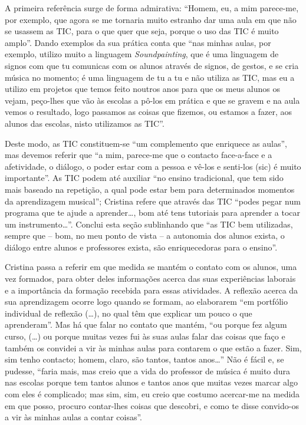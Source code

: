\documentclass{textolivre}
\begin{document}
A primeira referência surge de forma admirativa: “Homem, eu, a mim parece-me,
por exemplo, que agora se me tornaria muito estranho dar uma aula em que não se
usassem as TIC, para o que quer que seja, porque o uso das TIC é muito amplo”.
Dando exemplos da sua prática conta que “nas minhas aulas, por exemplo, utilizo
muito a linguagem \textit{Soundpainting}, que é uma linguagem de signos com que
tu comunicas com os alunos através de signos, de gestos, e se cria música no
momento; é uma linguagem de tu a tu e não utiliza as TIC, mas eu a utilizo em
projetos que temos feito noutros anos para que os meus alunos os vejam,
peço-lhes que vão às escolas a pô-los em prática e que se gravem e na aula
vemos o resultado, logo passamos as coisas que fizemos, ou estamos a fazer, aos
alunos das escolas, nisto utilizamos as TIC”.

Deste modo, as TIC constituem-se “um complemento que enriquece as aulas”, mas
devemos referir que “a mim, parece-me que o contacto face-a-face e a
afetividade, o diálogo, o poder estar com a pessoa e vê-los e senti-los (sic) é
muito importante”. As TIC podem até auxiliar “no ensino tradicional, que tem
sido mais baseado na repetição, a qual pode estar bem para determinados
momentos da aprendizagem musical”; Cristina refere que através das TIC “podes
pegar num programa que te ajude a aprender\ldots, bom até tens tutoriais para
aprender a tocar um instrumento\ldots”. Conclui esta seção sublinhando que “as
TIC bem utilizadas, sempre que – bom, no meu ponto de vista – a autonomia dos
alunos exista, o diálogo entre alunos e professores exista, são enriquecedoras
para o ensino”.

Cristina passa a referir em que medida se mantém o contato com os alunos, uma
vez formados, para obter deles informações acerca das suas experiências
laborais e a importância da formação recebida para essas atividades. A reflexão
acerca da sua aprendizagem ocorre logo quando se formam, ao elaborarem “em
portfólio individual de reflexão (\ldots), no qual têm que explicar um
pouco o que aprenderam”. Mas há que falar no contato que mantém, “ou porque fez
algum curso, (\ldots) ou porque muitas vezes fui às suas aulas falar das coisas
que faço e também os convidei a vir às minhas aulas para contarem o que estão a
fazer. Sim, sim tenho contacto; homem, claro, são tantos, tantos anos\ldots”
Não é fácil e, se pudesse, “faria mais, mas creio que a vida do professor de
música é muito dura nas escolas porque tem tantos alunos e tantos anos que
muitas vezes marcar algo com eles é complicado; mas sim, sim, eu creio que
costumo acercar-me na medida em que posso, procuro contar-lhes coisas que
descobri, e como te disse convido-os a vir às minhas aulas a contar coisas”.
\end{document}
